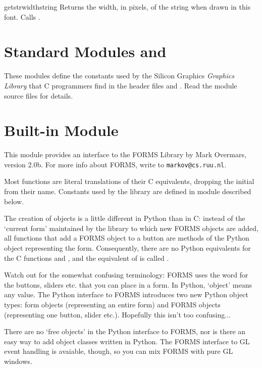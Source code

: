\begin{funcdesc}{getstrwidth}{string}
Returns the width, in pixels, of the string when drawn in this font.
Calls .
\end{funcdesc}

\section{Standard Modules  and }

These modules define the constants used by the Silicon Graphics
{\em Graphics Library}
that C programmers find in the header files
and
.
Read the module source files for details.

\section{Built-in Module }

This module provides an interface to the FORMS Library by Mark
Overmars, version 2.0b.  For more info about FORMS, write to
{\tt markov@cs.ruu.nl}.

Most functions are literal translations of their C equivalents,
dropping the initial  from their name.  Constants used by the
library are defined in module  described below.

The creation of objects is a little different in Python than in C:
instead of the `current form' maintained by the library to which new
FORMS objects are added, all functions that add a FORMS object to a
button are methods of the Python object representing the form.
Consequently, there are no Python equivalents for the C functions
 and , and the equivalent of
 is called .

Watch out for the somewhat confusing terminology: FORMS uses the word
 for the buttons, sliders etc. that you can place in a form.
In Python, `object' means any value.  The Python interface to FORMS
introduces two new Python object types: form objects (representing an
entire form) and FORMS objects (representing one button, slider etc.).
Hopefully this isn't too confusing...

There are no `free objects' in the Python interface to FORMS, nor is
there an easy way to add object classes written in Python.  The FORMS
interface to GL event handling is avaiable, though, so you can mix
FORMS with pure GL windows.

